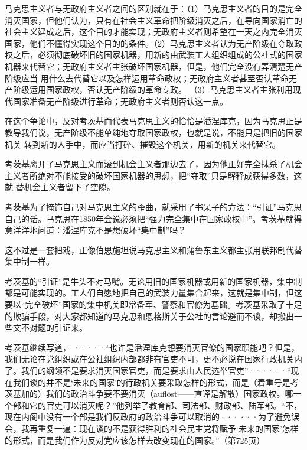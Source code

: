 马克思主义者与无政府主义者之间的区别就在于：（1）马克思主义者的目的是完全消灭国家，但他们认为，只有在社会主义革命把阶级消灭之后，在导向国家消亡的社会主义建成之后，这个目的才能实现；无政府主义者则希望在一天之内完全消灭国家，他们不懂得实现这个目的的条件。（2）马克思主义者认为无产阶级在夺取政权之后，必须彻底破坏旧的国家机器，用新的由武装工人组织组成的公社式的国家机器来代替它；无政府主义者主张破坏国家机器，但是，他们完全没有弄清楚无产阶级应当
用什么去代替它以及{\kaishu 怎样}运用革命政权；无政府主义者甚至否认革命无产阶级运用国家政权，否认无产阶级的革命专政。 （3）马克思主义者主张利用现代国家准备无产阶级进行革命；无政府主义者则否认这一点。

在这个争论中，反对考茨基而代表马克思主义的恰恰是潘涅库克，因为马克思正是教导我们说，无产阶级不能单纯地夺取国家政权，也就是说，不能只是把旧的国家机关
转到新的人手中，而应当打碎、摧毁这个机关，用新的机关来代替它。

考茨基离开了马克思主义而滚到机会主义者那边去了，因为他正好完全抹杀了机会主义者所绝对不能接受的破坏国家机器的思想，把“夺取”只是解释成获得多数，这就
替机会主义者留下了空隙。

考茨基为了掩饰自己对马克思主义的歪曲，就采用了书呆子的方法：“引证”马克思自己的话。马克思在1850年会说必须把“强力完全集中在国家政权中”。考茨基就得意洋洋地问道：潘涅库克不是想破坏“集中制”吗？

这不过是一套把戏，正像伯恩施坦说马克思主义和蒲鲁东主义都主张用联邦制代替集中制一样。

考茨基的“引证”是牛头不对马嘴。无论用旧的国家机器或用新的国家机器，集中制都是可能实现的。工人们自愿地把自己的武装力量集合起来，这就是集中制，但这要以“完全破坏”国家的集中机关即常备军、警察和官僚为基础。考茨基采取了十足的欺骗手段，对大家都知道的马克思和恩格斯关于公社的言论避而不谈，却搬出一些文不对题的引证来。

\pskip
\leftskip=10mm
\small

考茨基继续写道，······“也许是潘涅库克想要消灭官僚的国家职能吧？但是，我们无论在党组织或在公社组织内部都非有官吏不可，更不必说在国家行政机关内了。我们的纲领不是要求消灭国家官吏，而是要求由人民选举官吏”······“现在我们谈的并不是‘未来的国家’的行政机关要采取怎样的形式，而是（着重号是考茨基加的）我们的政治斗争要不要消灭（aufl\"{o}st——直译是解散）国家政权。哪一个部和它的官吏可以消灭呢？”他列举了教育部、司法部、财政部、陆军部。“不，现在内阁中没有一个部是我们反政府的政治斗争可以取消的······\quad 为了避免误会，我再重复一遍：现在谈的不是获得胜利的社会民主党将赋予‘未来的国家’怎样的形式，而是我们作为反对党应该怎样去改变现在的国家。”（第725页）

